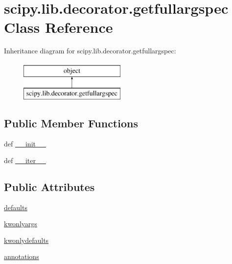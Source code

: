 \hypertarget{classscipy_1_1lib_1_1decorator_1_1getfullargspec}{}\section{scipy.\+lib.\+decorator.\+getfullargspec Class Reference}
\label{classscipy_1_1lib_1_1decorator_1_1getfullargspec}
Inheritance diagram for scipy.\+lib.\+decorator.\+getfullargspec\+:\begin{figure}[H]
\begin{center}
\leavevmode
\includegraphics[height=2.000000cm]{classscipy_1_1lib_1_1decorator_1_1getfullargspec}
\end{center}
\end{figure}
\subsection*{Public Member Functions}
\begin{DoxyCompactItemize}
\item 
def \hyperlink{classscipy_1_1lib_1_1decorator_1_1getfullargspec_ab9ee02e7a600577b6dde727676ec6203}{\+\_\+\+\_\+init\+\_\+\+\_\+}
\item 
def \hyperlink{classscipy_1_1lib_1_1decorator_1_1getfullargspec_a4a8257756cc5f1930566d06308baf5ef}{\+\_\+\+\_\+iter\+\_\+\+\_\+}
\end{DoxyCompactItemize}
\subsection*{Public Attributes}
\begin{DoxyCompactItemize}
\item 
\hyperlink{classscipy_1_1lib_1_1decorator_1_1getfullargspec_ad926951144c1d3b69b1220f93539f6d4}{defaults}
\item 
\hyperlink{classscipy_1_1lib_1_1decorator_1_1getfullargspec_adcfb93ab919bc543b693b4ce28d4912e}{kwonlyargs}
\item 
\hyperlink{classscipy_1_1lib_1_1decorator_1_1getfullargspec_ac38721630998d538141cf0bfd89c3273}{kwonlydefaults}
\item 
\hyperlink{classscipy_1_1lib_1_1decorator_1_1getfullargspec_acb1175dc1dc22980ae1d82d191841cc9}{annotations}
\end{DoxyCompactItemize}


